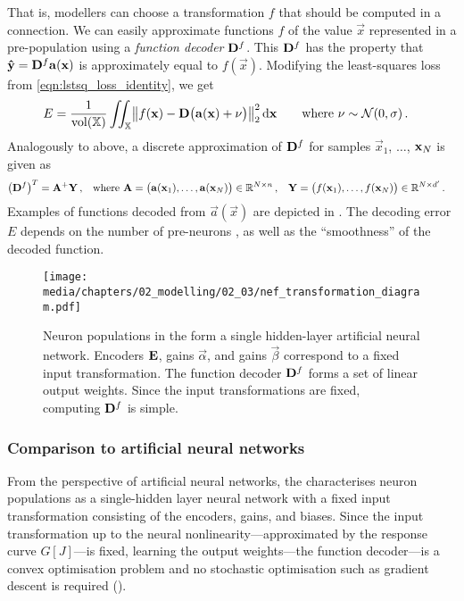 That is, modellers can choose a transformation $f$ that should be computed in a connection.
We can easily approximate functions $f$ of the value $\vec x$ represented in a pre-population using a \emph{function decoder} $\mathbf{D}^f$.
This $\mathbf{D}^f$ has the property that $\mathbf{\hat y} = \mathbf{D}^f \mathbf{a}(\mathbf{x})$ is approximately equal to $f(\vec x)$.
Modifying the least-squares loss from \cref{eqn:lstsq_loss_identity}, we get
\begin{align}
	E &= \frac{1}{\operatorname{vol}(\mathbb{X})} \iint_{\mathbb{X}} \bigl\| f(\mathbf{x}) - \mathbf{D} \bigl( \mathbf{a}(\mathbf{x}) + \nu \bigr) \bigr\|_2^2  \, \mathrm{d}\mathbf{x} \quad\quad \text{where } \nu \sim \mathcal{N}(0, \sigma) \,.
	\label{eqn:lstsq_loss_f}
\end{align}
Analogously to above, a discrete approximation of $\mathbf{D}^f$ for \Nsmpls samples ${\vec x}_1$, $\ldots$, ${\mathbf{x}}_{N}$ is given as 
\begin{align*}
	\bigl(\mathbf{D}^f\bigr)^T &= \mathbf{A}^+ \mathbf{Y} \,, &\text{where } \mathbf{A} &= \begin{pmatrix}\mathbf{a}(\mathbf{x}_1), \ldots, \mathbf{a}(\mathbf{x}_{N})\end{pmatrix} \in \mathbb{R}^{N \times n} \,, & \mathbf{Y} &= \begin{pmatrix}f(\mathbf{x}_1), \ldots, f(\mathbf{x}_{N})\end{pmatrix} \in \mathbb{R}^{N \times d'} \,.
\end{align*}
Examples of functions decoded from $\vec a(\vec x)$ are depicted in .
The decoding error $E$ depends on the number of pre-neurons \Npop, as well as the \enquote{smoothness} of the decoded function.

\begin{figure}
	\centering
	\vspace{0.25mm}
	\texttt{[image: media/chapters/02\_modelling/02\_03/nef\_transformation\_diagram.pdf]}
	\caption[Neuron populations in the NEF as a single hidden-layer artificial neural network]{Neuron populations in the \NEF form a single hidden-layer artificial neural network. Encoders $\mathbf{E}$, gains $\vec \alpha$, and gains $\vec \beta$ correspond to a fixed input transformation. The function decoder $\mathbf{D}^f$ forms a set of linear output weights. Since the input transformations are fixed, computing $\mathbf{D}^f$ is simple.}
	\label{fig:nef_transformation_diagram}
\end{figure}

\subsubsection{Comparison to artificial neural networks}
From the perspective of artificial neural networks, the \NEF characterises neuron populations as a single-hidden layer neural network with a fixed input transformation consisting of the encoders, gains, and biases.
Since the input transformation up to the neural nonlinearity---approximated by the response curve $G[J]$---is fixed, learning the output weights---the function decoder---is a convex optimisation problem and no stochastic optimisation such as gradient descent is required ().

